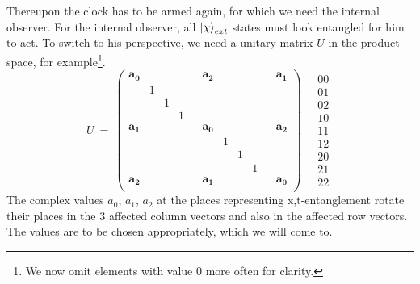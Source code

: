 \documentclass[12pt]{article}
\begin{document}
Thereupon the clock has to be armed again, for which we need the internal observer. For the internal observer, all $\ket{\chi}_{ext}$ states must look entangled for him to act. To switch to his perspective, we need a unitary matrix $U$ in the product space, for example\footnote{We now omit elements with value 0 more often for clarity.}.
\begin{equation}
U\ =\ 
\begin{pmatrix}
\label{eq:U}
\pmb{a_0} &&&&& \pmb{a_2} &&&&& \pmb{a_1} \\
  & 1 &   &   &   &   &   &   &   &   &   \\
  &   & 1 &   &   &   &   &   &   &   &   \\
  &   &   & 1 &   &   &   &   &   &   &   \\
\pmb{a_1} &&&&& \pmb{a_0} &&&&& \pmb{a_2} \\
  &   &   &   &   &   & 1 &   &   &   &   \\
  &   &   &   &   &   &   & 1 &   &   &   \\
  &   &   &   &   &   &   &   & 1 &   &   \\
\pmb{a_2} &&&&& \pmb{a_1} &&&&& \pmb{a_0} \\
\end{pmatrix}
\quad
\begin{matrix}
00 \\ 01 \\ 02 \\ 10 \\ 11 \\ 12 \\ 20 \\ 21 \\ 22 
\end{matrix}
\end{equation}
The complex values $a_0$, $a_1$, $a_2$ at the places representing x,t-entanglement rotate their places in the 3 affected column vectors and also in the affected row vectors. The values are to be chosen appropriately, which we will come to.
\end{document}
